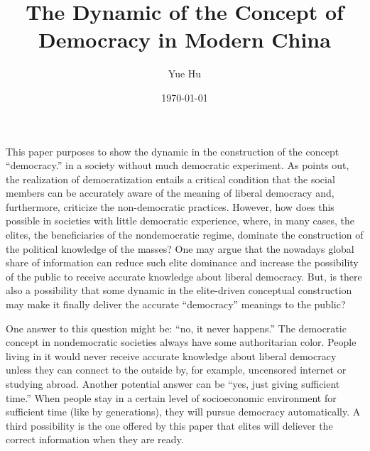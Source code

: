 \documentclass[abstracton,UTF8]{ctexart}
\author{Yue Hu}
\begin{document}
	\title{The Dynamic of the Concept of Democracy in Modern China}
	\date{\today}
	\maketitle
	
	\setlength{\parindent}{2em} %

This paper purposes to show the dynamic in the construction of the concept ``democracy.'' in a society without much democratic experiment. As \citet{Diamond2006} points out, the realization of democratization entails a critical condition that the social members can be accurately aware of the meaning of liberal democracy and, furthermore, criticize the non-democratic practices. However, how does this possible in societies with little democratic experience, where, in many cases, the elites, the beneficiaries of the nondemocratic regime, dominate the construction of the political knowledge of the masses? One may argue that the nowadays global share of information can reduce such elite dominance and increase the possibility of the public to receive accurate knowledge about liberal democracy. But, is there also a possibility that some dynamic in the elite-driven conceptual construction may make it finally deliver the accurate  ``democracy'' meanings to the public?  

One answer to this question might be: ``no, it never happens.'' The democratic concept in nondemocratic societies always have some authoritarian color. People living in it would never receive accurate knowledge about liberal democracy unless they can connect to the outside by, for example, uncensored internet or studying abroad. Another potential answer can be ``yes, just giving sufficient time.'' When people stay in a certain level of socioeconomic environment for sufficient time (like by generations), they will pursue democracy automatically. A third possibility is the one offered by this paper that elites will deliever the correct information when they are ready.
\end{document}
